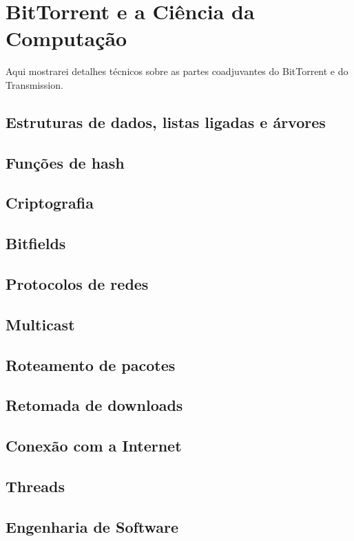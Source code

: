 
\chapter{BitTorrent e a Ciência da Computação}

Aqui mostrarei detalhes técnicos sobre as partes coadjuvantes do BitTorrent e do Transmission.


\section{Estruturas de dados, listas ligadas e árvores}
\section{Funções de hash} %
\section{Criptografia} %
\section{Bitfields}
\section{Protocolos de redes} %
\section{Multicast}
\section{Roteamento de pacotes} %
\section{Retomada de downloads}
\section{Conexão com a Internet}
\section{Threads}
\section{Engenharia de Software}

\clearpage
